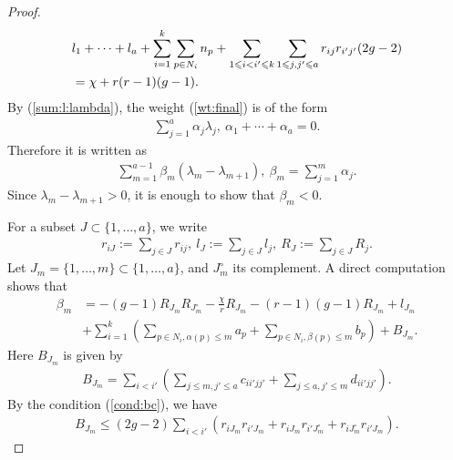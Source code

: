 \documentclass[11pt,oneside,a4paper,mathscr]{amsart}
\theoremstyle{definition}
\renewcommand{\leq}{\leqslant}
\begin{document}
\begin{proof}
\begin{align}\label{sum:l:lambda}
    &l_1+\cdots+l_a+\sum_{i=1}^k \sum_{p\in N_i}n_p +\sum_{1\leq i<i'\leq k}\sum_{1\leq j, j' \leq a}r_{ij} r_{i'j'}(2g-2) \\
    &\notag =\chi+r(r-1)(g-1).
\end{align}
By (\ref{sum:l:lambda}), the weight (\ref{wt:final}) is of the form 
\begin{align*}
    \sum_{j=1}^a \alpha_j \lambda_j, \ \alpha_1+\cdots+\alpha_a=0.
\end{align*}
Therefore it is written as 
\begin{align*}
    \sum_{m=1}^{a-1} \beta_m (\lambda_m-\lambda_{m+1}), \ \beta_m=\sum_{j=1}^m \alpha_j.
\end{align*}
Since $\lambda_m-\lambda_{m+1}>0$, it is enough to show that $\beta_m<0$. 

For a subset $J\subset \{1, \ldots, a\}$, 
we write 
\begin{align*}r_{iJ}:=\sum_{j\in J}r_{ij}, \ l_{J}:=\sum_{j\in J}l_j, \ 
R_J:=\sum_{j\in J} R_j.
\end{align*}
Let $J_m=\{1, \ldots, m\} \subset \{1, \ldots, a\}$, and $J_m^{\circ}$ its complement. 
A direct computation shows that 
\begin{align*}
    \beta_m&=-(g-1)R_{J_m}R_{J_m^{\circ}}-\frac{\chi}{r}R_{J_m}-(r-1)(g-1)R_{J_m}+l_{J_m} \\
    &+\sum_{i=1}^k\left(\sum_{p\in N_i, \alpha(p)\leq m}a_p+\sum_{p\in N_i, \beta(p)\leq m}b_p\right)+B_{J_m}.
\end{align*}
Here $B_{J_m}$ is given by 
\begin{align*}
    B_{J_m}=\sum_{i<i'}\left(\sum_{j\leq m, j'\leq a}c_{i i' j j'}+\sum_{j\leq a, j'\leq m}d_{i i' j j'}\right).
\end{align*}
By the condition (\ref{cond:bc}), 
we have 
\begin{align*}
    B_{J_m} \leq (2g-2)\sum_{i<i'}(r_{iJ_m}r_{i'J_m}+r_{iJ_m}r_{i' J_m^{\circ}}+r_{i J_m^{\circ}}r_{i' J_m}).
\end{align*}


\end{proof}
\end{document}
